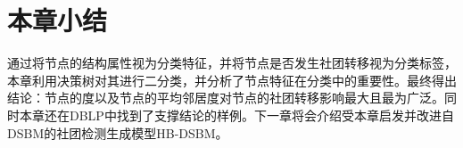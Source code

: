\section{本章小结}

通过将节点的结构属性视为分类特征，并将节点是否发生社团转移视为分类标签，本章利用决策树对其进行二分类，并分析了节点特征在分类中的重要性。最终得出结论：节点的度以及节点的平均邻居度对节点的社团转移影响最大且最为广泛。同时本章还在DBLP中找到了支撑结论的样例。下一章将会介绍受本章启发并改进自DSBM的社团检测生成模型HB-DSBM。


























